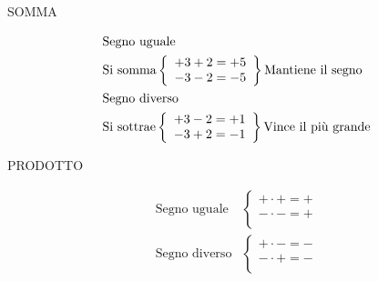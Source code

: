 \documentclass[preview]{standalone}
\begin{document}
	\begin{center}
		{\Huge SOMMA}
	\end{center}
	\begin{align*}
	\intertext{Segno uguale}
	&\text{Si somma}\left \{ \begin{array}{l}
+3+2=+5	\\
-3-2=-5\\
	\end{array}
	\right\}\text{Mantiene il segno}\\
		\intertext{Segno diverso}
	&\text{Si sottrae}\left \{ \begin{array}{l}
	+3-2=+1	\\
	-3+2=-1\\
	\end{array}
	\right\}\text{Vince il più grande}\\
	\end{align*}
	\begin{center}
		{\Huge PRODOTTO}
	\end{center}
\begin{align*}
\text{Segno uguale}&\left \{\begin{array}{l}
+\cdot +=+	\\
-\cdot -=+	\\
\end{array}
\right.\\
\text{Segno diverso}&\left \{\begin{array}{l}
+\cdot -=-	\\
-\cdot +=-	\\
\end{array}
\right.\\
\end{align*}
\end{document}

